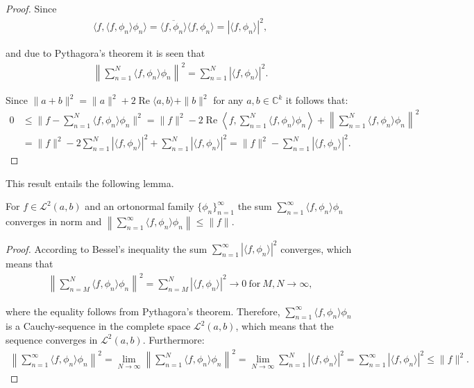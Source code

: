 \begin{proof}
Since
\begin{align*}
\langle f, \langle f,\phi_n \rangle \phi_n \rangle = \overline{\langle f,\phi_n \rangle} \langle f,\phi_n \rangle = |\langle f, \phi_n \rangle|^2,
\end{align*}

and due to Pythagora's theorem it is seen that
\begin{align*}
\left\|\sum_{n=1}^N \langle f, \phi_n \rangle \phi_n \right\|^2 = \sum_{n=1}^N |\langle f, \phi_n \rangle |^2.
\end{align*}

Since $\|a + b\|^2 = \|a\|^2 + 2 \operatorname{Re} \langle a,b  \rangle + \|b\|^2$ for any $a,b \in \mathbb{C}^k$ \cite{page 64, FAA} it follows that:
\begin{align*}
0 &\leq \|f - \sum_{n=1}^N \langle f, \phi_n \rangle \phi_n\|^2 = \|f\|^2 - 2\operatorname{Re} \left\langle f, \sum_{n=1}^N \langle f,\phi_n\rangle \phi_n \right\rangle + \left\|\sum_{n=1}^N \langle f, \phi_n \rangle \phi_n \right\|^2 \\
&= \|f\|^2 - 2\sum_{n=1}^N |\langle f, \phi_n \rangle |^2 + \sum_{n=1}^N |\langle f, \phi_n \rangle |^2 = \|f\|^2 - \sum_{n=1}^N |\langle f, \phi_n \rangle |^2.
\end{align*}
\end{proof}

This result entails the following lemma.
\begin{lemma}
For $f \in \mathcal{L}^2(a,b)$ and an ortonormal family $\{\phi_n\}_{n=1}^\infty$ the sum $\sum_{n=1}^\infty \langle f,\phi_n \rangle \phi_n$ converges in norm and $\left\| \sum_{n=1}^\infty \langle f,\phi_n \rangle \phi_n \right\| \leq \|f\|$.
\end{lemma}

\begin{proof}
According to Bessel's inequality the sum $\sum_{n=1}^\infty | \langle f,\phi_n \rangle |^2$ converges, which means that
\begin{align*}
\left\|\sum_{n=M}^N \langle f, \phi_n \rangle \phi_n \right\|^2 = \sum_{n=M}^N |\langle f, \phi_n \rangle |^2 \to 0 \ \text{for} \ M,N \to \infty,
\end{align*}

where the equality follows from Pythagora's theorem. Therefore, $\sum_{n=1}^\infty \langle f,\phi_n \rangle \phi_n$ is a Cauchy-sequence in the complete space $\mathcal{L}^2(a,b)$, which means that the sequence converges in $\mathcal{L}^2(a,b)$. Furthermore:
\begin{align*}
\left\|\sum_{n=1}^\infty \langle f, \phi_n \rangle \phi_n \right\|^2 = \lim_{N\to \infty} \left\|\sum_{n=1}^N \langle f, \phi_n \rangle \phi_n \right\|^2 = \lim_{N\to\infty} \sum_{n=1}^N | \langle f,\phi_n \rangle |^2 = \sum_{n=1}^\infty | \langle f,\phi_n \rangle |^2 \leq \|f\|^2.
\end{align*}
\end{proof}

